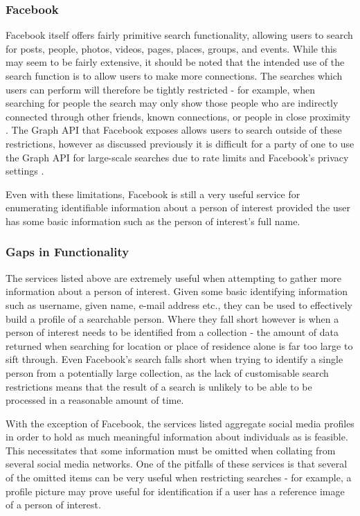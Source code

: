 \documentclass[12pt]{article}
\begin{document}
\subsubsection{Facebook}
Facebook itself offers fairly primitive search functionality, allowing users to search for posts, people, photos, videos, pages, places, groups, and events. While this may seem to be fairly extensive, it should be noted that the intended use of the search function is to allow users to make more connections. The searches which users can perform will therefore be tightly restricted - for example, when searching for people the search may only show those people who are indirectly connected through other friends, known connections, or people in close proximity \citep{facebookpeoplesearch}. The Graph API that Facebook exposes allows users to search outside of these restrictions, however as discussed previously it is difficult for a party of one to use the Graph API for large-scale searches due to rate limits and Facebook's privacy settings \citep{facebookgraphapi}. 

Even with these limitations, Facebook is still a very useful service for enumerating identifiable information about a person of interest provided the user has some basic information such as the person of interest's full name.

\subsubsection{Gaps in Functionality}
The services listed above are extremely useful when attempting to gather more information about a person of interest. Given some basic identifying information such as username, given name, e-mail address etc., they can be used to effectively build a profile of a searchable person. Where they fall short however is when a person of interest needs to be identified from a collection - the amount of data returned when searching for location or place of residence alone is far too large to sift through. Even Facebook's search falls short when trying to identify a single person from a potentially large collection, as the lack of customisable search restrictions means that the result of a search is unlikely to be able to be processed in a reasonable amount of time.

With the exception of Facebook, the services listed aggregate social media profiles in order to hold as much meaningful information about individuals as is feasible. This necessitates that some information must be omitted when collating from several social media networks. One of the pitfalls of these services is that several of the omitted items can be very useful when restricting searches - for example, a profile picture may prove useful for identification if a user has a reference image of a person of interest.
\end{document}
